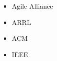 \section{}

\vspace{8pt} %

\begin{multicols}{4}
\begin{itemize}
\item Agile Alliance
\item ARRL
\item ACM
\item IEEE
\end{itemize}
\end{multicols}